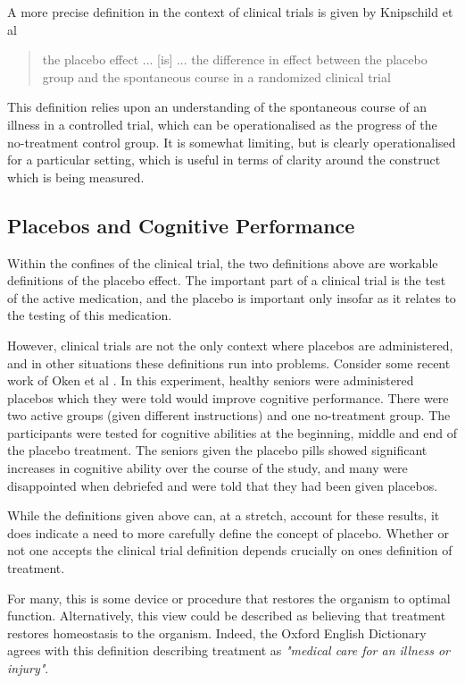 A more precise definition in the context of clinical trials is given by Knipschild et al \cite{Knipschild2005}

\begin{quotation}
   the placebo effect ... [is] ... the difference in effect between the placebo group and the spontaneous course in a randomized clinical trial 
\end{quotation}

This definition relies upon an understanding of the spontaneous course of an illness in a controlled trial, which can be operationalised as the progress of the no-treatment control group. It is somewhat limiting, but is clearly operationalised for a particular setting, which is useful in terms of clarity around the construct which is being measured. 

\subsection{Placebos and Cognitive Performance}
\label{sec:plac-cogn-perf}

Within the confines of the clinical trial, the two definitions above are workable definitions of the placebo effect. The important part of a clinical trial is the test of the active medication, and the placebo is important only insofar as it relates to the testing of this medication. 

However, clinical trials are not the only context where placebos are administered, and in other situations these definitions run into problems. Consider some recent work of Oken et al \cite{Oken2008}. In this experiment, healthy seniors were administered placebos which they were told would improve cognitive performance. There were two active groups (given different instructions) and one no-treatment group. The participants were tested for cognitive abilities at the beginning, middle and end of the placebo treatment.  The seniors given the placebo pills showed significant increases in cognitive ability over the course of the study, and many were disappointed when debriefed and were told that they had been given placebos.

While the definitions given above can, at a stretch, account for these results, it does indicate a need to more carefully define the concept of placebo. Whether or not one accepts the clinical trial definition depends crucially on ones definition of treatment. 

For many, this is some device or procedure that restores the organism to optimal function. Alternatively, this view could be described as believing that treatment restores homeostasis to the organism. Indeed, the Oxford English Dictionary agrees with this definition describing treatment as \textit{"medical care for an illness or injury"}.

